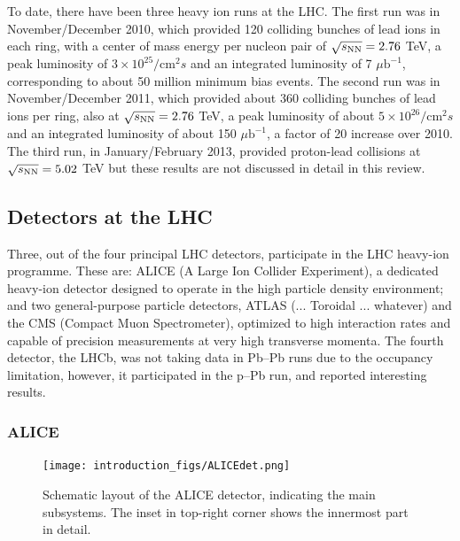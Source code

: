 To date, there have been three heavy ion runs at the LHC.
The first run was in November/December 2010,
which provided 120 colliding bunches of lead ions in each ring, with a center of mass energy per nucleon
pair of $\mbox{$\sqrt{s_{\mathrm{NN}}}$} =2.76$ TeV, a peak luminosity of $3 \times 10^{25} / \mathrm{cm}^2 s$ and an integrated luminosity
of 7 $\mu \mathrm{b}^{-1}$, corresponding to about 50 million minimum bias events.
The second run was in November/December 2011, which provided about 360 colliding bunches of lead ions per ring,
also at $\mbox{$\sqrt{s_{\mathrm{NN}}}$} =2.76$ TeV, a peak luminosity of
about $5 \times 10^{26}  / \mathrm{cm}^2 s$ and an integrated luminosity of
about 150 $\mu \mathrm{b}^{-1}$, a factor of 20 increase over 2010.
The third run, in January/February 2013, provided proton-lead collisions
at $\mbox{$\sqrt{s_{\mathrm{NN}}}$}=5.02$ TeV but these results are not discussed
in detail in this review.

\subsection{Detectors at the LHC}
\label{subsecall:detectors}

Three, out of the four principal LHC detectors, participate in the LHC heavy-ion programme. These are: ALICE (A Large Ion Collider Experiment), a dedicated heavy-ion detector designed to operate in the high particle density environment; and two general-purpose particle detectors, ATLAS (... Toroidal ... whatever) and the CMS (Compact Muon Spectrometer), optimized to high interaction rates and capable of precision measurements at very high transverse momenta. The fourth detector, the LHCb, was not taking data in Pb--Pb runs due to the occupancy limitation, however, it participated in the p--Pb run, and reported interesting results. 

\subsubsection{ALICE}

\begin{figure}
\begin{center}
\texttt{[image: introduction\_figs/ALICEdet.png]}
\caption{Schematic layout of the ALICE detector, indicating the main subsystems. The inset in top-right corner shows the innermost part in detail.}
\label{figks:ALICEdet}
\end{center}
\end{figure}


